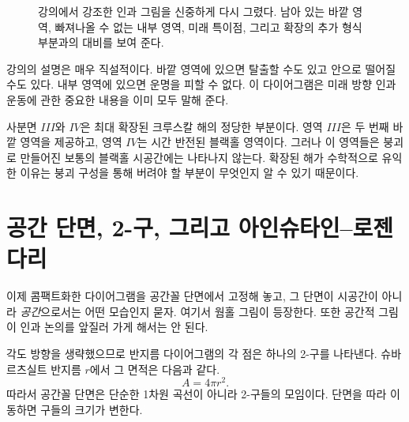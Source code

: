 \begin{figure}[htbp]
\centering
{}
\caption{강의에서 강조한 인과 그림을 신중하게 다시 그렸다. 남아 있는 바깥 영역, 빠져나올 수 없는 내부 영역, 미래 특이점, 그리고 확장의 추가 형식 부분과의 대비를 보여 준다.}
\end{figure}

강의의 설명은 매우 직설적이다. 바깥 영역에 있으면 탈출할 수도 있고 안으로 떨어질 수도 있다. 내부 영역에 있으면 운명을 피할 수 없다. 이 다이어그램은 미래 방향 인과 운동에 관한 중요한 내용을 이미 모두 말해 준다.

사분면 \(III\)와 \(IV\)은 최대 확장된 크루스칼 해의 정당한 부분이다. 영역 \(III\)은 두 번째 바깥 영역을 제공하고, 영역 \(IV\)는 시간 반전된 블랙홀 영역이다. 그러나 이 영역들은 붕괴로 만들어진 보통의 블랙홀 시공간에는 나타나지 않는다. 확장된 해가 수학적으로 유익한 이유는 붕괴 구성을 통해 버려야 할 부분이 무엇인지 알 수 있기 때문이다.

\section{공간 단면, 2-구, 그리고 아인슈타인--로젠 다리}

이제 콤팩트화한 다이어그램을 공간꼴 단면에서 고정해 놓고, 그 단면이 시공간이 아니라 \emph{공간}으로서는 어떤 모습인지 묻자. 여기서 웜홀 그림이 등장한다. 또한 공간적 그림이 인과 논의를 앞질러 가게 해서는 안 된다.

각도 방향을 생략했으므로 반지름 다이어그램의 각 점은 하나의 2-구를 나타낸다. 슈바르츠실트 반지름 \(r\)에서 그 면적은 다음과 같다.
\begin{equation}
A=4\pi r^2.
\end{equation}
따라서 공간꼴 단면은 단순한 1차원 곡선이 아니라 2-구들의 모임이다. 단면을 따라 이동하면 구들의 크기가 변한다.

